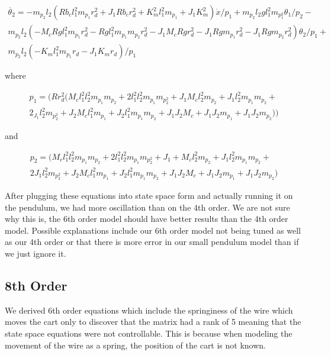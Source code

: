 \documentclass{article}
\begin{document}
\begin{multline*} 
\label{eqn6th6}
\ddot{\theta_2} = -m_p_2 l_2 (R b_c l_1^2 m_p_1 r_d^2+J_1 R b_c r_d^2+K_m^2 l_1^2 m_p_1+J_1 K_m^2)\dot{x}/p_1 +m_p_2 l_2 g l_1^2 m_p_1^2 \theta_1/p_2 - \\m_p_2 l_2 (-M_c R g l_1^2 m_p_1 r_d^2-R g l_1^2 m_p_1 m_p_2 r_d^2-J_1 M_c R g r_d^2-J_1 R g m_p_1 r_d^2-J_1 R g m_p_2 r_d^2) \theta_2/p_1 + \\m_p_2 l_2 (-K_m l_1^2 m_p_1 r_d-J_1 K_m r_d)/p_1
\end{multline*}

where 

\begin{multline*} 
\label{p1}
p_1 = (R r_d^2 (M_c l_1^2 l_2^2 m_p_1 m_p_2+2 l_1^2 l_2^2 m_p_1 m_p_2^2+J_1 M_c l_2^2 m_p_2+J_1 l_2^2 m_p_1 m_p_2+\\2_J_1 l_2^2 m_p_2^2+J_2 M_c l_1^2 m_p_1+J_2 l_1^2 m_p_1 m_p_2+J_1 J_2 M_c+J_1 J_2 m_p_1+J_1 J_2 m_p_2))
\end{multline*}

and 

\begin{multline*} 
\label{p2}
 p_2 = (M_c l_1^2 l_2^2 m_p_1 m_p_2+2 l_1^2 l_2^2 m_p_1 m_p_2^2+J_1+M_c l_2^2 m_p_2+J_1 l_2^2 m_p_1 m_p_2+\\2 J_1 l_2^2 m_p_2^2+J_2 M_c l_1^2 m_p_1+J_2 l_1^2 m_p_1 m_p_2+J_1 J_2 M_c+J_1 J_2 m_p_1+J_1 J_2 m_p_2)
\end{multline*}

After plugging these equations into state space form and actually running it on the pendulum, we had more oscillation than on the 4th order. We are not sure why this is, the 6th order model should have better results than the 4th order model. Possible explanations include our 6th order model not being tuned as well as our 4th order or that there is more error in our small pendulum model than if we just ignore it.

\subsection{8th Order}
We derived 6th order equations which include the springiness of the wire which moves the cart only to discover that the matrix had a rank of 5 meaning that the state space equations were not controllable. This is because when modeling the movement of the wire as a spring, the position of the cart is not known. 
\end{document}
